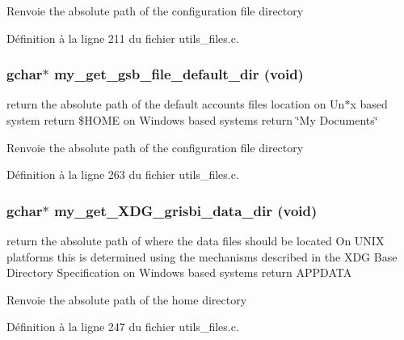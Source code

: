 \begin{DoxyReturn}{Renvoie}
the absolute path of the configuration file directory 
\end{DoxyReturn}


Définition à la ligne 211 du fichier utils\_\-files.c.

\subsubsection[{my\_\-get\_\-gsb\_\-file\_\-default\_\-dir}]{\setlength{\rightskip}{0pt plus 5cm}gchar$\ast$ my\_\-get\_\-gsb\_\-file\_\-default\_\-dir (void)}\label{utils__files_8c_ab0e498f3274063f20c4a6fb54b52271a}
return the absolute path of the default accounts files location on Un$\ast$x based system return \$HOME on Windows based systems return \char`\"{}My Documents\char`\"{}

\begin{DoxyReturn}{Renvoie}
the absolute path of the configuration file directory 
\end{DoxyReturn}


Définition à la ligne 263 du fichier utils\_\-files.c.

\subsubsection[{my\_\-get\_\-XDG\_\-grisbi\_\-data\_\-dir}]{\setlength{\rightskip}{0pt plus 5cm}gchar$\ast$ my\_\-get\_\-XDG\_\-grisbi\_\-data\_\-dir (void)}\label{utils__files_8c_a73d323b60da65cb56316d1a057fcd312}
return the absolute path of where the data files should be located On UNIX platforms this is determined using the mechanisms described in the XDG Base Directory Specification on Windows based systems return APPDATA

\begin{DoxyReturn}{Renvoie}
the absolute path of the home directory 
\end{DoxyReturn}


Définition à la ligne 247 du fichier utils\_\-files.c.

